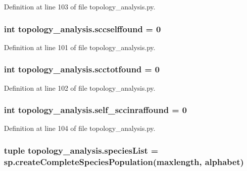 Definition at line 103 of file topology\-\_\-analysis.\-py.

\hypertarget{a00157_aeacefe088f3283ea0e80ee31c0486d6d}{
\subsubsection[{sccselffound}]{\setlength{\rightskip}{0pt plus 5cm}int topology\-\_\-analysis.\-sccselffound = 0}}\label{a00157_aeacefe088f3283ea0e80ee31c0486d6d}


Definition at line 101 of file topology\-\_\-analysis.\-py.

\hypertarget{a00157_ac05c0aaedb357a42df2d5f3915bbedfa}{
\subsubsection[{scctotfound}]{\setlength{\rightskip}{0pt plus 5cm}int topology\-\_\-analysis.\-scctotfound = 0}}\label{a00157_ac05c0aaedb357a42df2d5f3915bbedfa}


Definition at line 102 of file topology\-\_\-analysis.\-py.

\hypertarget{a00157_a4d888d782ac3414961c2b844bed8b1bd}{
\subsubsection[{self\-\_\-sccinraffound}]{\setlength{\rightskip}{0pt plus 5cm}int topology\-\_\-analysis.\-self\-\_\-sccinraffound = 0}}\label{a00157_a4d888d782ac3414961c2b844bed8b1bd}


Definition at line 104 of file topology\-\_\-analysis.\-py.

\hypertarget{a00157_a5bfc4cfa78ac777159cb0ca9c9c5c2f6}{
\subsubsection[{species\-List}]{\setlength{\rightskip}{0pt plus 5cm}tuple topology\-\_\-analysis.\-species\-List = sp.\-create\-Complete\-Species\-Population(maxlength, {\bf alphabet})}}\label{a00157_a5bfc4cfa78ac777159cb0ca9c9c5c2f6}


